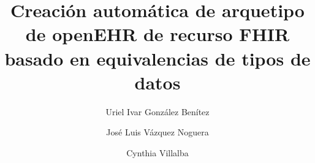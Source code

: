 \title{Creación automática de arquetipo de openEHR de recurso FHIR basado en equivalencias de tipos de datos}

\author{Uriel Ivar González Benítez}

\author{José Luis Vázquez Noguera}

\author{Cynthia Villalba}

